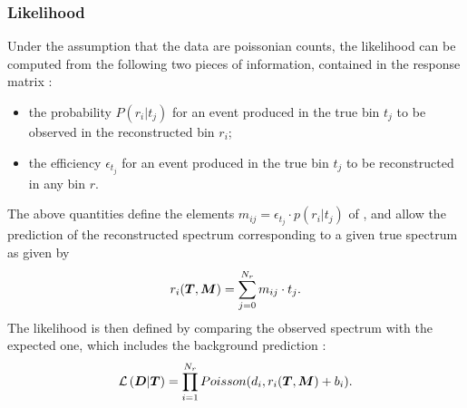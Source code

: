 \subsubsection{Likelihood}
\label{sec:fbullhood}
Under the assumption that the data are poissonian counts, the
likelihood \conditionalLhood{\Data{}}{\Truth{},\TrasfMatrix{}} can be
computed from the following two pieces of information, contained in
the response matrix \TrasfMatrix{}:
\begin{itemize}
\item the probability $P(r_i|t_j)$ for an event produced in the true bin
  $t_j$ to be observed in the reconstructed bin $r_i$;
\item the efficiency $\epsilon{}_{t_j}$ for an event produced in the
  true bin $t_j$ to be reconstructed in any bin $r$.
\end{itemize}
The above quantities define the elements
$m_{ij}=\epsilon_{t_j}\cdot{}p(r_i|t_j)$ of \TrasfMatrix{}, and allow
the prediction of the reconstructed spectrum \Reco{} corresponding to
a given true spectrum \Truth{} as given by
\begin{equation}
r_i(\boldsymbol{T}{},\boldsymbol{M}{}) = \sum_{j=0}^{N_r}m_{ij}\cdot{}t_j.
\end{equation}
The likelihood is then defined by comparing the observed spectrum
\Data{} with the expected one, which includes the background
prediction \Bckg{}:
\begin{equation}
\label{eq:lhood}
\mathcal{L}\left(\boldsymbol{D}{}|\boldsymbol{T}{}\right) =
\prod_{i=1}^{N_r}Poisson(d_i,r_i(\boldsymbol{T}{},\boldsymbol{M}{})+b_i).
\end{equation}

